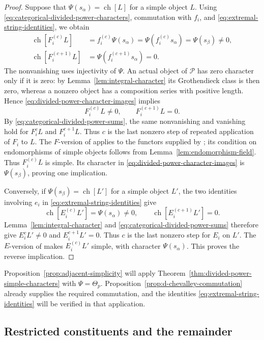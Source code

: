 \documentclass[12pt,reqno,a4paper]{amsart}
\numberwithin{equation}{section}
\numberwithin{figure}{section}
\theoremstyle{plain}
\theoremstyle{definition}
\newcommand{\cP}{\mathcal P}
\DeclareMathOperator{\ch}{ch}
\begin{document}
\begin{proof}
Suppose that $\Psi(s_\alpha)=\ch[L]$ for a simple object $L$.
Using \eqref{eq:categorical-divided-power-characters}, commutation
with $f_i$, and \eqref{eq:extremal-string-identities}, we obtain
\begin{equation}\label{eq:divided-power-character-images}
\begin{aligned}
\ch[F_i^{(c)}L]
&=f_i^{(c)}\Psi(s_\alpha)
 =\Psi(f_i^{(c)}s_\alpha)=\Psi(s_\beta)\neq0,\\
\ch[F_i^{(c+1)}L]
&=\Psi(f_i^{(c+1)}s_\alpha)=0.
\end{aligned}
\end{equation}
The nonvanishing uses injectivity of $\Psi$.  An actual object of
$\cP$ has zero character only if it is zero: by
Lemma~\ref{lem:integral-character} its Grothendieck class is then
zero, whereas a nonzero object has a composition series with
positive length.  Hence \eqref{eq:divided-power-character-images}
implies
\[
F_i^{(c)}L\neq0,
\qquad
F_i^{(c+1)}L=0.
\]
By \eqref{eq:categorical-divided-power-sums}, the same nonvanishing
and vanishing hold for $F_i^cL$ and $F_i^{c+1}L$.  Thus $c$ is the
last nonzero step of repeated application of $F_i$ to $L$.
The $F$-version of \cite[Proposition~5.20(a)]{CR} applies to
the functors supplied by \cite[Theorem~4]{HTY}; its condition
on endomorphisms of simple objects follows from
Lemma~\ref{lem:endomorphism-field}.
Thus $F_i^{(c)}L$ is simple.  Its character in
\eqref{eq:divided-power-character-images} is $\Psi(s_\beta)$,
proving one implication.

Conversely, if $\Psi(s_\beta)=\ch[L']$ for a simple object $L'$,
the two identities involving $e_i$ in
\eqref{eq:extremal-string-identities} give
\[
\ch[E_i^{(c)}L']=\Psi(s_\alpha)\neq0,
\qquad
\ch[E_i^{(c+1)}L']=0.
\]
Lemma~\ref{lem:integral-character} and
\eqref{eq:categorical-divided-power-sums} therefore give
$E_i^cL'\neq0$ and $E_i^{c+1}L'=0$.  Thus $c$ is the last
nonzero step for $E_i$ on $L'$.  The $E$-version of
\cite[Proposition~5.20(a)]{CR} makes $E_i^{(c)}L'$ simple, with
character $\Psi(s_\alpha)$.  This proves the reverse implication.
\end{proof}

Proposition~\ref{prop:adjacent-simplicity} will apply
Theorem~\ref{thm:divided-power-simple-characters} with $\Psi=\Theta_p$.
Proposition~\ref{prop:d-chevalley-commutation} already supplies the
required commutation, and the identities
\eqref{eq:extremal-string-identities} will be verified in that
application.

\subsection{Restricted constituents and the remainder}
\label{subsec:restricted-projection}
\end{document}
